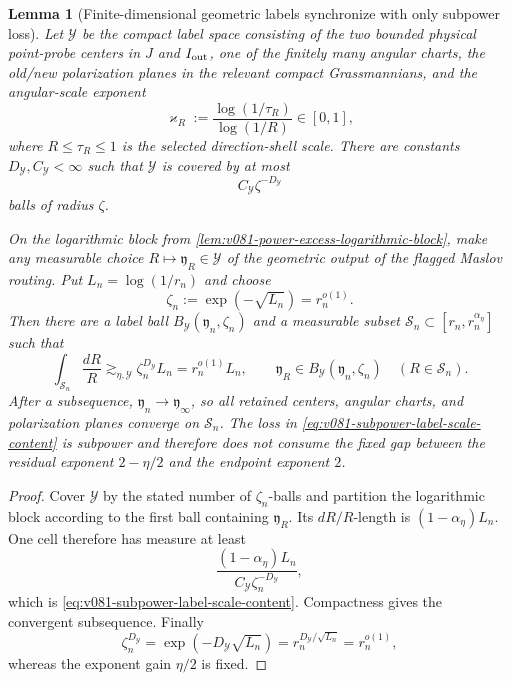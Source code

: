 \documentclass[10pt]{article}
\newtheorem{lemma}[theorem]{Lemma}
\begin{document}
\begin{lemma}[Finite-dimensional geometric labels synchronize with only subpower loss]
\label{lem:v081-subpower-label-synchronization}
Let \(\mathcal Y\) be the compact label space consisting of the two bounded physical point-probe
centers in \(J\) and \(I_{\rm out}\), one of the finitely many angular charts, the old/new
polarization planes in the relevant compact Grassmannians, and the angular-scale exponent
\[
\varkappa_R
:=
\frac{\log(1/\tau_R)}{\log(1/R)}
\in[0,1],
\]
where \(R\le\tau_R\le1\) is the selected direction-shell scale.  There are constants
\(D_{\mathcal Y},C_{\mathcal Y}<\infty\) such that \(\mathcal Y\) is covered by at most
\[
C_{\mathcal Y}\zeta^{-D_{\mathcal Y}}
\]
balls of radius \(\zeta\).

On the logarithmic block from
\cref{lem:v081-power-excess-logarithmic-block}, make any measurable choice
\(R\mapsto\mathfrak y_R\in\mathcal Y\) of the geometric output of the flagged Maslov routing.
Put \(L_n=\log(1/r_n)\) and choose
\[
\zeta_n:=\exp(-\sqrt{L_n})=r_n^{o(1)}.
\]
Then there are a label ball \(B_{\mathcal Y}(\mathfrak y_n,\zeta_n)\) and a measurable subset
\(\mathcal S_n\subset[r_n,r_n^{\alpha_\eta}]\) such that
\begin{equation}
\label{eq:v081-subpower-label-scale-content}
\boxed{
\int_{\mathcal S_n}\frac{dR}{R}
\gtrsim_{\eta,\mathcal Y}
\zeta_n^{D_{\mathcal Y}}L_n
=
r_n^{o(1)}L_n,
\qquad
\mathfrak y_R\in B_{\mathcal Y}(\mathfrak y_n,\zeta_n)
\quad(R\in\mathcal S_n).
}
\end{equation}
After a subsequence, \(\mathfrak y_n\to\mathfrak y_\infty\), so all retained centers, angular
charts, and polarization planes converge on \(\mathcal S_n\).  The loss in
\eqref{eq:v081-subpower-label-scale-content} is subpower and therefore does not consume the fixed
gap between the residual exponent \(2-\eta/2\) and the endpoint exponent \(2\).
\end{lemma}

\begin{proof}
Cover \(\mathcal Y\) by the stated number of \(\zeta_n\)-balls and partition the logarithmic block
according to the first ball containing \(\mathfrak y_R\).  Its \(dR/R\)-length is
\((1-\alpha_\eta)L_n\).  One cell therefore has measure at least
\[
\frac{(1-\alpha_\eta)L_n}
{C_{\mathcal Y}\zeta_n^{-D_{\mathcal Y}}},
\]
which is \eqref{eq:v081-subpower-label-scale-content}.  Compactness gives the convergent
subsequence.  Finally
\[
\zeta_n^{D_{\mathcal Y}}
=
\exp(-D_{\mathcal Y}\sqrt{L_n})
=
r_n^{D_{\mathcal Y}/\sqrt{L_n}}
=
r_n^{o(1)},
\]
whereas the exponent gain \(\eta/2\) is fixed.
\end{proof}
\end{document}
